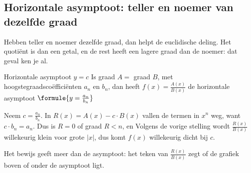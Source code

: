 \subsection{Horizontale asymptoot: teller en noemer van dezelfde graad}

Hebben teller en noemer dezelfde graad, dan helpt de euclidische deling. Het quotiënt is dan een getal, en de rest heeft een lagere graad dan de noemer: dat geval ken je al.

\begin{theorie}
\begin{stelling}{Horizontale asymptoot $y = c$}
Is graad $A =$ graad $B$, met hoogstegraadscoëfficiënten $a_n$ en $b_n$, dan heeft $f(x) = \frac{A(x)}{B(x)}$ de horizontale asymptoot \quad $\formule{y = \frac{a_n}{b_n}}$
\end{stelling}

\begin{bewijs}
Neem $c = \frac{a_n}{b_n}$. In $R(x) = A(x) - c \cdot B(x)$ vallen de termen in $x^n$ weg, want $c \cdot b_n = a_n$. Dus is $R = 0$ of graad $R < n$, en
Volgens de vorige stelling wordt $\frac{R(x)}{B(x)}$ willekeurig klein voor grote $|x|$, dus komt $f(x)$ willekeurig dicht bij $c$.
\end{bewijs}
\end{theorie}

Het bewijs geeft meer dan de asymptoot: het teken van $\frac{R(x)}{B(x)}$ zegt of de grafiek boven of onder de asymptoot ligt.


